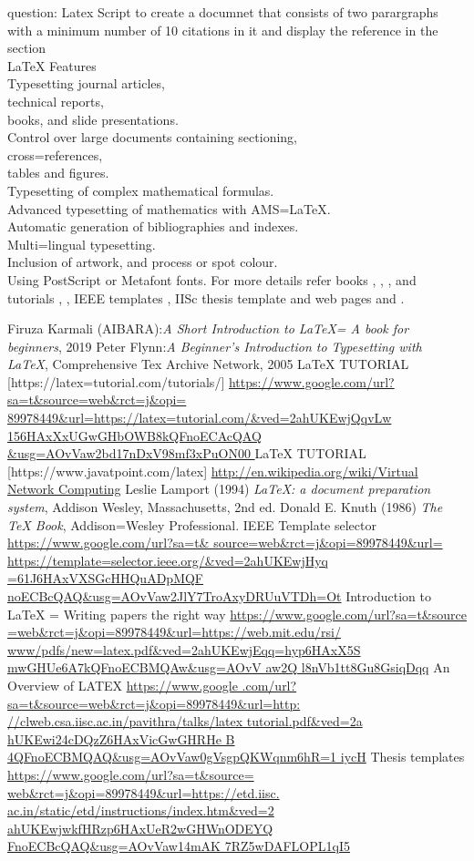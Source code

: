 \documentclass[]{report}
\begin{document}
question: Latex Script to create a documnet that consists of two
parargraphs with a minimum number of 10 citations in it and
display the reference in the section\\
LaTeX Features\\
Typesetting journal articles,\\ technical reports,\\
books, and slide presentations.\\
Control over large documents containing sectioning,\\
cross=references,\\ tables and figures.\\
Typesetting of complex mathematical formulas.\\
Advanced typesetting of mathematics with AMS=LaTeX.\\
Automatic generation of bibliographies and indexes.\\
Multi=lingual typesetting.\\
Inclusion of artwork, and process or spot colour.\\
Using PostScript or Metafont fonts.
For more details refer books \cite{ref1}, \cite{ref2}, \cite{ref5},
\cite{ref6} and tutorials \cite{ref3}, \cite{ref4}, IEEE templates
\cite{ref7} , IISc thesis template \cite{ref10} and web pages
\cite{ref8} and \cite{ref9}.
\begin{thebibliography}{20}
 Firuza Karmali (AIBARA):\emph{A Short Introduction
to LaTeX= A book for beginners}, 2019
 Peter Flynn:\emph{A Beginner’s Introduction to
Typesetting with LaTeX}, Comprehensive Tex Archive Network, 2005
 LaTeX TUTORIAL [https://latex=tutorial.com/tutorials/]
\url{https://www.google.com/url?sa=t&source=web&rct=j&opi=
89978449&url=https://latex=tutorial.com/&ved=2ahUKEwjQqvLw
156HAxXxUGwGHbOWB8kQFnoECAcQAQ
&usg=AOvVaw2bd17nDxV98mf3xPuON00 }
 LaTeX TUTORIAL [https://www.javatpoint.com/latex]
\url{http://en.wikipedia.org/wiki/Virtual Network Computing}
Leslie Lamport (1994) \emph{\LaTeX: a document
preparation system}, Addison
Wesley, Massachusetts, 2nd ed.
Donald E. Knuth (1986) \emph{The \TeX{} Book},
Addison=Wesley Professional.
IEEE Template selector \url{https://www.google.com/url?sa=t&
source=web&rct=j&opi=89978449&url=
https://template=selector.ieee.org/&ved=2ahUKEwjHyq
=61J6HAxVXSGcHHQuADpMQF
noECBcQAQ&usg=AOvVaw2JlY7TroAxyDRUuVTDh=Ot}
Introduction to LaTeX = Writing papers the
right way \url{https://www.google.com/url?sa=t&source
=web&rct=j&opi=89978449&url=https://web.mit.edu/rsi/
www/pdfs/new=latex.pdf&ved=2ahUKEwjEqq=hyp6HAxX5S
mwGHUe6A7kQFnoECBMQAw&usg=AOvV
aw2Q l8nVb1tt8Gu8GsiqDqq}
An Overview of LATEX \url{https://www.google
.com/url?sa=t&source=web&rct=j&opi=89978449&url=http:
//clweb.csa.iisc.ac.in/pavithra/talks/latex tutorial.pdf&ved=2a
hUKEwi24cDQzZ6HAxVicGwGHRHe
B 4QFnoECBMQAQ&usg=AOvVaw0gVsgpQKWqnm6hR=1 iycH}
Thesis templates \url{https://www.google.com/url?sa=t&source=
web&rct=j&opi=89978449&url=https://etd.iisc.
ac.in/static/etd/instructions/index.htm&ved=2
ahUKEwjwkfHRzp6HAxUeR2wGHWnODEYQ
FnoECBcQAQ&usg=AOvVaw14mAK 7RZ5wDAFLOPL1qI5}
\end{thebibliography}
\end{document}
